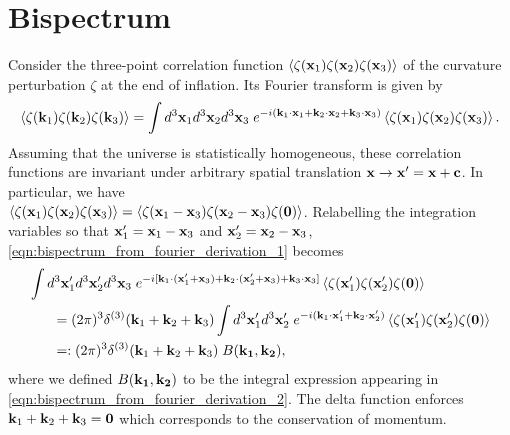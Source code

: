 \section{Bispectrum} \label{section:bispectrum}

Consider the three-point correlation function $\left< \zeta(\mathbf{x}_1) \zeta(\mathbf{x}_2) \zeta(\mathbf{x}_3) \right>$  of the curvature perturbation $\zeta$ at the end of inflation. Its Fourier transform is given by
\begin{align}
	\left< \zeta(\mathbf{k}_1) \zeta(\mathbf{k}_2) \zeta(\mathbf{k}_3) \right> = \int d^3\mathbf{x}_1 d^3\mathbf{x}_2 d^3\mathbf{x}_3 \; e^{-i(\mathbf{k}_1 \cdot \mathbf{x}_1 + \mathbf{k}_2 \cdot \mathbf{x}_2 + \mathbf{k}_3 \cdot \mathbf{x}_3 )} \left< \zeta(\mathbf{x}_1) \zeta(\mathbf{x}_2) \zeta(\mathbf{x}_3) \right>. \label{eqn:bispectrum_from_fourier_derivation_1}
\end{align}
Assuming that the universe is statistically homogeneous, these correlation functions are invariant under arbitrary spatial translation $\mathbf{x} \rightarrow \mathbf{x}' = \mathbf{x} + \mathbf{c}$. In particular, we have \\${\left< \zeta(\mathbf{x}_1) \zeta(\mathbf{x}_2) \zeta(\mathbf{x}_3) \right> = \left< \zeta(\mathbf{x}_1 - \mathbf{x}_3) \zeta(\mathbf{x}_2 - \mathbf{x}_3) \zeta(\mathbf{0}) \right>}$. Relabelling the integration variables so that $\mathbf{x}'_1=\mathbf{x}_1-\mathbf{x}_3$ and $\mathbf{x}'_2=\mathbf{x}_2-\mathbf{x}_3$, \eqref{eqn:bispectrum_from_fourier_derivation_1} becomes
\begin{align}
	&\int d^3\vv{x}'_1 d^3\vv{x}'_2 d^3\vv{x}_3 \; e^{-i[ \vv{k}_1 \cdot (\vv{x}'_1 + \vv{x}_3) + \vv{k}_2 \cdot (\vv{x}'_2 + \vv{x}_3) + \vv{k}_3 \cdot \vv{x}_3 ]} \left< \zeta(\vv{x}'_1) \zeta(\vv{x}'_2) \zeta(\vv{0}) \right> \nonumber \\
	&\hspace{0.05\textwidth} = (2\pi)^3 \delta^{(3)}(\vv{k}_1 + \vv{k}_2 + \vv{k}_3) \int d^3\vv{x}'_1 d^3\vv{x}'_2 \; e^{-i( \vv{k}_1 \cdot \vv{x}'_1 + \vv{k}_2 \cdot \vv{x}'_2)} \left< \zeta(\vv{x}'_1) \zeta(\vv{x}'_2) \zeta(\vv{0}) \right> \label{eqn:bispectrum_from_fourier_derivation_2}\\
	&\hspace{0.05\textwidth} =: (2\pi)^3 \delta^{(3)}(\vv{k}_1 + \vv{k}_2 + \vv{k}_3) \; B(\vv{k_1}, \vv{k_2}), \label{eqn:bispectrum_from_fourier_derivation_3}
\end{align}
where we defined $B(\mathbf{k_1}, \mathbf{k_2})$ to be the integral expression appearing in \eqref{eqn:bispectrum_from_fourier_derivation_2}. The delta function enforces $\mathbf{k}_1 + \mathbf{k}_2 + \mathbf{k}_3 = \mathbf{0}$ which corresponds to the conservation of momentum.

